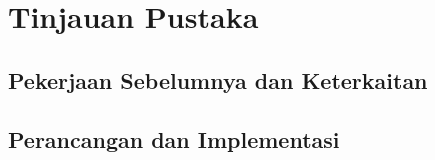 \chapter{Tinjauan Pustaka}
\blindtext[2]

\section{Pekerjaan Sebelumnya dan Keterkaitan}
\blindtext[3]
\section{Perancangan dan Implementasi}
\blindtext[2]
